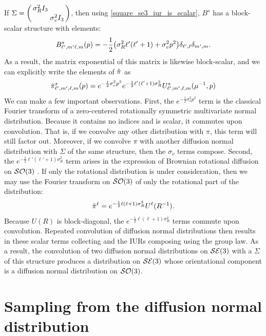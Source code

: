 \documentclass[../../main.tex]{subfiles}
\begin{document}
\begin{refsection}
	If $\Sigma = \smqty(\dmat{\sigma_R^2 I_3, \sigma_v^2 I_3})$, then using \cref{square_se3_iur_is_scalar}, $B^s$ has a block-scalar structure with elements:
	$$B^s_{\ell',m'\ell,m}(p) = - \frac{1}{2} \qty(\sigma_R^2 \ell' (\ell' + 1) + \sigma_v^2 p^2) \delta_{\ell',\ell} \delta_{m',m}.$$
	As a result, the matrix exponential of this matrix is likewise block-scalar, and we can explicitly write the elements of $\hat{\pi}$ as
	\begin{equation}
		\hat{\pi}^s_{\ell',m',\ell,m}(p) = e^{-\frac{1}{2} \sigma_v^2 p^2} e^{- \frac{1}{2} \ell' (\ell' + 1) \sigma_R^2} U^s_{\ell',m',\ell,m}(\mu^{-1}, p)
	\end{equation}
	We can make a few important observations.
	First, the $e^{-\frac{1}{2} \sigma_v^2 p^2}$ term is the classical Fourier transform of a zero-centered rotationally symmetric multivariate normal distribution.
	Because it contains no indices and is scalar, it commutes upon convolution.
	That is, if we convolve any other distribution with $\pi$, this term will still factor out.
	Moreover, if we convolve $\pi$ with another diffusion normal distribution with $\Sigma$ of the same structure, then the $\sigma_v$ terms compose.
	Second, the $e^{- \frac{1}{2} \ell' (\ell' + 1) \sigma_R^2}$ term arises in the expression of Brownian rotational diffusion on $\mathcal{SO} (3)$ \supercite{perrinEtudeMathematiqueMouvement1928}.
	If only the rotational distribution is under consideration, then we may use the Fourier transform on $\mathcal{SO} (3)$ of only the rotational part of the distribution:
	$$\hat{\pi}^{\ell} = e^{- \frac{1}{2} \ell (\ell + 1) \sigma_R^2} U^{\ell}(R^{-1}).$$
	Because $U(R)$ is block-diagonal, the $e^{- \frac{1}{2} \ell (\ell + 1) \sigma_R^2}$ terms commute upon convolution.
	Repeated convolution of diffusion normal distributions then results in these scalar terms collecting and the IURs composing using the group law.
	As a result, the convolution of two diffusion normal distributions on $\mathcal{SE} (3)$ with a $\Sigma$ of this structure produces a distribution on $\mathcal{SE} (3)$ whose orientational component is a diffusion normal distribution on $\mathcal{SO} (3)$.

	\section{Sampling from the diffusion normal distribution}


\end{refsection}
\end{document}
